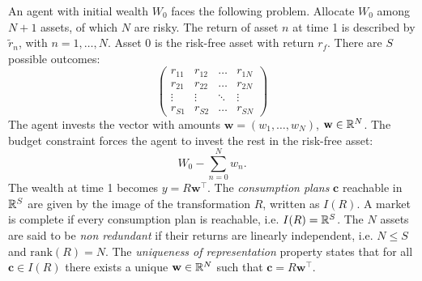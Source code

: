 \documentclass[twoside, titlepage]{article}
\begin{document}
An agent with initial wealth $W_0$ faces the following problem. Allocate $W_0$ among $N+1$ assets, of which $N$ are risky. The return of asset $n$ at time 1 is described by $\tilde{r}_n$, with $n = 1, \dots, N$. Asset 0 is the risk-free asset with return $r_f$. There are $S$ possible outcomes:
\[
    \begin{pmatrix}
        r_{11} & r_{12} & \dots & r_{1N} \\
        r_{21} & r_{22} & \dots & r_{2N} \\
        \vdots & \vdots & \ddots & \vdots \\
        r_{S1} & r_{S2} & \dots & r_{SN}
    \end{pmatrix}
\]
The agent invests the vector with amounts $\mathbf{w} = (w_1, \dots, w_N)$, $\mathbf{w} \in \mathbb{R}^{N}$. The budget constraint forces the agent to invest the rest in the risk-free asset:
\[
    W_0 - \sum_{n=0}^N w_n.
\]
The wealth at time 1 becomes $y = R\mathbf{w}^\top$. The \textit{consumption plans} $\mathbf{c}$ reachable in $\mathbb{R}^S$ are given by the image of the transformation $R$, written as $I(R)$. A market is complete if every consumption plan is reachable, i.e. $I(R) = \mathbb{R}^S$. The $N$ assets are said to be \textit{non redundant} if their returns are linearly independent, i.e. $N \leq S$ and $\text{rank}(R) = N$. The \textit{uniqueness of representation} property states that for all $\mathbf{c} \in I(R)$ there exists a unique $\mathbf{w} \in \mathbb{R}^N$ such that $\mathbf{c} = R\mathbf{w}^\top$. 

\end{document}
